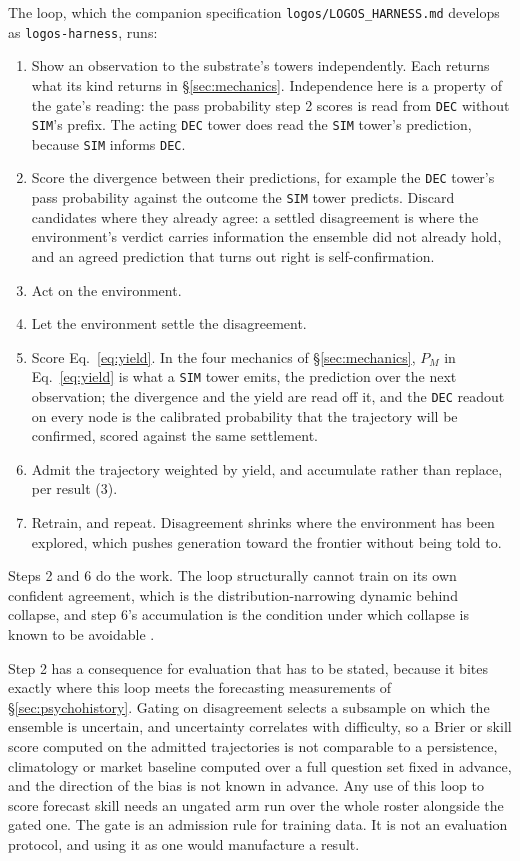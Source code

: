 \documentclass[11pt]{article}
\begin{document}
\begin{sloppypar}
The loop, which the companion specification \texttt{logos/}\allowbreak\texttt{LOGOS\_HARNESS.md} develops as \texttt{logos-harness}, runs:
\end{sloppypar}

\begin{enumerate}[label=\arabic*.,itemsep=2pt]
\item Show an observation to the substrate's towers independently. Each returns what its kind returns in \S\ref{sec:mechanics}. Independence here is a property of the gate's reading: the pass probability step 2 scores is read from \texttt{DEC} without \texttt{SIM}'s prefix. The acting \texttt{DEC} tower does read the \texttt{SIM} tower's prediction, because \texttt{SIM} informs \texttt{DEC}.
\item Score the divergence between their predictions, for example the \texttt{DEC} tower's pass probability against the outcome the \texttt{SIM} tower predicts. Discard candidates where they already agree: a settled disagreement is where the environment's verdict carries information the ensemble did not already hold, and an agreed prediction that turns out right is self-confirmation.
\item Act on the environment.
\item Let the environment settle the disagreement.
\item Score Eq.~\eqref{eq:yield}. In the four mechanics of \S\ref{sec:mechanics}, $P_M$ in Eq.~\eqref{eq:yield} is what a \texttt{SIM} tower emits, the prediction over the next observation; the divergence and the yield are read off it, and the \texttt{DEC} readout on every node is the calibrated probability that the trajectory will be confirmed, scored against the same settlement.
\item Admit the trajectory weighted by yield, and accumulate rather than replace, per result (3).
\item Retrain, and repeat. Disagreement shrinks where the environment has been explored, which pushes generation toward the frontier without being told to.
\end{enumerate}

Steps 2 and 6 do the work. The loop structurally cannot train on its own confident agreement, which is the distribution-narrowing dynamic behind collapse, and step 6's accumulation is the condition under which collapse is known to be avoidable \cite{gerstgrasser2024}.

Step 2 has a consequence for evaluation that has to be stated, because it bites exactly where this loop meets the forecasting measurements of \S\ref{sec:psychohistory}. Gating on disagreement selects a subsample on which the ensemble is uncertain, and uncertainty correlates with difficulty, so a Brier or skill score computed on the admitted trajectories is not comparable to a persistence, climatology or market baseline computed over a full question set fixed in advance, and the direction of the bias is not known in advance. Any use of this loop to score forecast skill needs an ungated arm run over the whole roster alongside the gated one. The gate is an admission rule for training data. It is not an evaluation protocol, and using it as one would manufacture a result.
\end{document}
